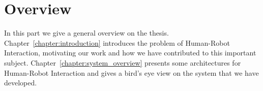 \part{Overview}

In this part we give a general overview on the thesis. Chapter~\ref{chapter:introduction} introduces the problem of Human-Robot Interaction, motivating our work and how we have contributed to this important subject. Chapter~\ref{chapter:system_overview} presents some architectures for Human-Robot Interaction and gives a bird's eye view on the system that we have developed.




